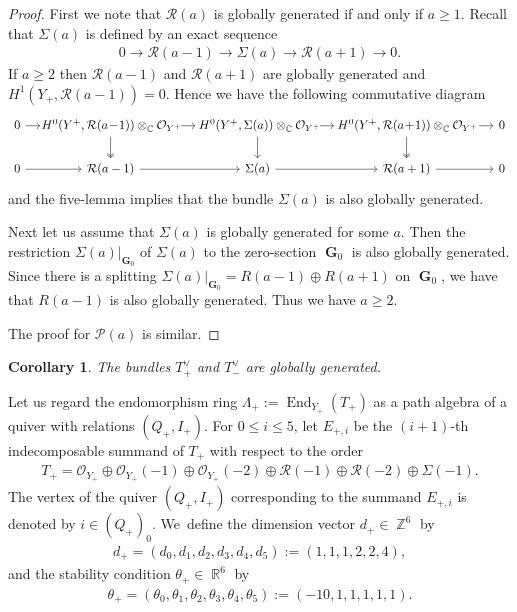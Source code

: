 \documentclass[10pt,a4paper]{amsart}
\DeclareMathOperator{\CC}{\mathbb{C}}
\DeclareMathOperator{\End}{End}
\DeclareMathOperator{\G}{\mathbf{G}}
\DeclareMathOperator{\RR}{\mathbb{R}}
\DeclareMathOperator{\ZZ}{\mathbb{Z}}
\newcommand{\stsh}{\mathcal{O}}
\numberwithin{equation}{section}
\newtheorem{Corollary}[Theorem]{Corollary}
\begin{document}
\begin{proof}
First we note that $\mathcal{R}(a)$ is globally generated if and only if $a \geq 1$.
Recall that $\Sigma(a)$ is defined by an exact sequence
\begin{gather*}
0 \to \mathcal{R}(a-1) \to \Sigma(a) \to \mathcal{R}(a+1) \to 0.
\end{gather*}
If $a \geq 2$ then $\mathcal{R}(a-1)$ and $\mathcal{R}(a+1)$ are globally generated and $H^1(Y_+, \mathcal{R}(a-1)) = 0$.
Hence we have the following commutative diagram
$$\begin{tikzcd}[column sep = small]
0 \rar&[0em]\!\! H^0(Y^+, \mathcal{R}(a\!-\!1)) \otimes_{\CC} \stsh_{Y^+} \!\rar\! \!\arrow[d, twoheadrightarrow] &[0em]\! H^0(Y^+, \Sigma(a)) \otimes_{\CC} \stsh_{Y^+} \!\rar \!\!\arrow[d] &[0em]
\!H^0(Y^+, \mathcal{R}(a\!+\!1)) \otimes_{\CC} \stsh_{Y^+} \!\rar \!\arrow[d, twoheadrightarrow] &[0em] 0
\\
0 \arrow[r] & \mathcal{R}(a-1) \arrow[r] & \Sigma(a) \arrow[r] &\mathcal{R}(a+1) \arrow[r] & 0
\end{tikzcd}
$$
and the five-lemma implies that the bundle $\Sigma(a)$ is also globally generated.

Next let us assume that $\Sigma(a)$ is globally generated for some $a$.
Then the restriction $\Sigma(a)|_{\G_0}$ of $\Sigma(a)$ to the zero-section $\G_0$ is also globally generated.
Since there is a splitting $\Sigma(a)|_{\G_0} = R(a-1) \oplus R(a+1)$ on $\G_0$, we have that $R(a-1)$ is also globally generated.
Thus we have $a \geq 2$.

The proof for $\mathcal{P}(a)$ is similar.
\end{proof}

\begin{Corollary}
The bundles $T_+^{\vee}$ and $T_-^{\vee}$ are globally generated.
\end{Corollary}

Let us regard the endomorphism ring $\Lambda_+ := \End_{Y_+}(T_+)$ as a path algebra of a quiver with relations $(Q_+, I_+)$.
For $0 \leq i \leq 5$, let $E_{+, i}$ be the $(i+1)$-th indecomposable summand of $T_+$ with respect to the order
\begin{gather*}
T_+ = \stsh_{Y_+} \oplus \stsh_{Y_+}(-1) \oplus \stsh_{Y_+}(-2) \oplus \mathcal{R}(-1) \oplus \mathcal{R}(-2) \oplus \Sigma(-1).
\end{gather*}
The vertex of the quiver $(Q_+, I_+)$ corresponding to the summand $E_{+, i}$ is denoted by $i \in (Q_+)_0$.
We~define the dimension vector $d_+ \in \ZZ^{6}$ by
\begin{gather*}
d_+ = (d_0, d_1, d_2, d_3, d_4, d_5) := (1,1,1,2,2,4),
\end{gather*}
and the stability condition $\theta_+ \in \RR^{6}$ by
\begin{gather*}
\theta_+ = (\theta_0, \theta_1, \theta_2, \theta_3, \theta_4, \theta_5) := (-10, 1,1,1,1,1).
\end{gather*}
\end{document}
